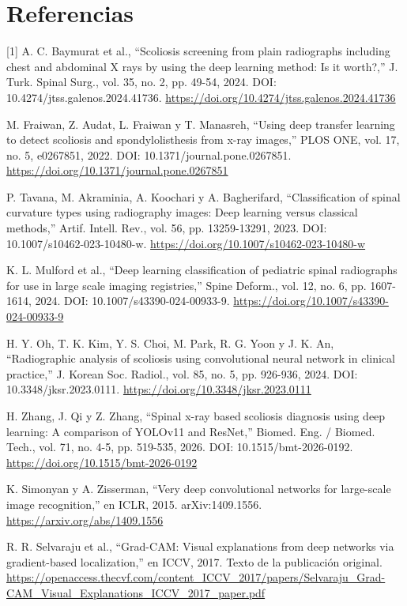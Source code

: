\documentclass[conference]{IEEEtran}
\begin{document}
\newpage
\section*{Referencias}
[1] A. C. Baymurat et al., “Scoliosis screening from plain radiographs including chest and abdominal X rays by using the deep learning method: Is it worth?,” J. Turk. Spinal Surg., vol. 35, no. 2, pp. 49-54, 2024. DOI: 10.4274/jtss.galenos.2024.41736. \url{https://doi.org/10.4274/jtss.galenos.2024.41736}
\par\medskip
[2] M. Fraiwan, Z. Audat, L. Fraiwan y T. Manasreh, “Using deep transfer learning to detect scoliosis and spondylolisthesis from x-ray images,” PLOS ONE, vol. 17, no. 5, e0267851, 2022. DOI: 10.1371/journal.pone.0267851. \url{https://doi.org/10.1371/journal.pone.0267851}
\par\medskip
[3] P. Tavana, M. Akraminia, A. Koochari y A. Bagherifard, “Classification of spinal curvature types using radiography images: Deep learning versus classical methods,” Artif. Intell. Rev., vol. 56, pp. 13259-13291, 2023. DOI: 10.1007/s10462-023-10480-w. \url{https://doi.org/10.1007/s10462-023-10480-w}
\par\medskip
[4] K. L. Mulford et al., “Deep learning classification of pediatric spinal radiographs for use in large scale imaging registries,” Spine Deform., vol. 12, no. 6, pp. 1607-1614, 2024. DOI: 10.1007/s43390-024-00933-9. \url{https://doi.org/10.1007/s43390-024-00933-9}
\par\medskip
[5] H. Y. Oh, T. K. Kim, Y. S. Choi, M. Park, R. G. Yoon y J. K. An, “Radiographic analysis of scoliosis using convolutional neural network in clinical practice,” J. Korean Soc. Radiol., vol. 85, no. 5, pp. 926-936, 2024. DOI: 10.3348/jksr.2023.0111. \url{https://doi.org/10.3348/jksr.2023.0111}
\par\medskip
[6] H. Zhang, J. Qi y Z. Zhang, “Spinal x-ray based scoliosis diagnosis using deep learning: A comparison of YOLOv11 and ResNet,” Biomed. Eng. / Biomed. Tech., vol. 71, no. 4-5, pp. 519-535, 2026. DOI: 10.1515/bmt-2026-0192. \url{https://doi.org/10.1515/bmt-2026-0192}
\par\medskip
[7] K. Simonyan y A. Zisserman, “Very deep convolutional networks for large-scale image recognition,” en ICLR, 2015. arXiv:1409.1556. \url{https://arxiv.org/abs/1409.1556}
\par\medskip
[8] R. R. Selvaraju et al., “Grad-CAM: Visual explanations from deep networks via gradient-based localization,” en ICCV, 2017. Texto de la publicación original. \url{https://openaccess.thecvf.com/content_ICCV_2017/papers/Selvaraju_Grad-CAM_Visual_Explanations_ICCV_2017_paper.pdf}
\end{document}
